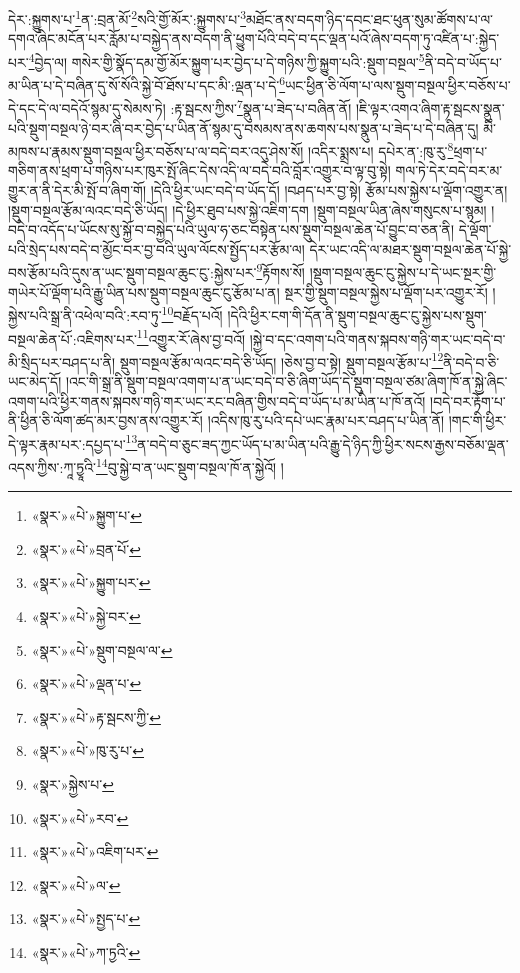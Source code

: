དེར་:སྐྱུགས་པ་\footnote{«སྣར་»«པེ་»སྐྱུག་པ་}ན་:བྲན་མོ་\footnote{«སྣར་»«པེ་»བྲན་པོ་}སའི་གྱོ་མོར་:སྐྱུགས་པ་\footnote{«སྣར་»«པེ་»སྐྱུག་པར་}མཐོང་ནས་བདག་ཉིད་དབང་ཐང་ཕུན་སུམ་ཚོགས་པ་ལ་དགའ་ཞིང་མངོན་པར་རློམ་པ་བསྐྱེད་ནས་བདག་ནི་ཕྱུག་པོའི་བདེ་བ་དང་ལྡན་པའོ་ཞེས་བདག་ཏུ་འཛིན་པ་:སྐྱེད་པར་\footnote{«སྣར་»«པེ་»སྐྱེ་བར་}བྱེད་ལ། གསེར་གྱི་སྣོད་དམ་གྱོ་མོར་སྐྱུག་པར་བྱེད་པ་དེ་གཉིས་ཀྱི་སྐྱུག་པའི་:སྡུག་བསྔལ་\footnote{«སྣར་»«པེ་»སྡུག་བསྔལ་ལ་}ནི་བདེ་བ་ཡོད་པ་མ་ཡིན་པ་དེ་བཞིན་དུ་སོ་སོའི་སྐྱེ་བོ་ཐོས་པ་དང་མི་:ལྡན་པ་དེ་\footnote{«སྣར་»«པེ་»ལྡན་པ་}ཡང་ཕྱིན་ཅི་ལོག་པ་ལས་སྡུག་བསྔལ་ཕྱིར་བཅོས་པ་དེ་དང་དེ་ལ་བདེའོ་སྙམ་དུ་སེམས་ཏེ། :རྟ་སྦངས་ཀྱིས་\footnote{«སྣར་»«པེ་»རྟ་སྦངས་ཀྱི་}སྣུན་པ་ཟེད་པ་བཞིན་ནོ། །ཇི་ལྟར་འགའ་ཞིག་རྟ་སྦངས་སྣུན་པའི་སྡུག་བསྔལ་ཉེ་བར་ཞི་བར་བྱེད་པ་ཡིན་ནོ་སྙམ་དུ་བསམས་ནས་ཆགས་པས་སྣུན་པ་ཟེད་པ་དེ་བཞིན་དུ། མི་མཁས་པ་རྣམས་སྡུག་བསྔལ་ཕྱིར་བཅོས་པ་ལ་བདེ་བར་འདུ་ཤེས་སོ། །འདིར་སྨྲས་པ། དཔེར་ན་:ཁུ་རུ་\footnote{«སྣར་»«པེ་»ཁུ་རུ་པ་}ཕྲག་པ་གཅིག་ནས་ཕྲག་པ་གཉིས་པར་ཁུར་སྤོ་ཞིང་དེས་འདི་ལ་བདེ་བའི་བློར་འགྱུར་བ་ལྟ་བུ་སྟེ། གལ་ཏེ་དེར་བདེ་བར་མ་གྱུར་ན་ནི་དེར་མི་སྤོ་བ་ཞིག་གོ། །དེའི་ཕྱིར་ཡང་བདེ་བ་ཡོད་དོ། །བཤད་པར་བྱ་སྟེ། རྩོམ་པས་སྐྱེས་པ་ལྡོག་འགྱུར་ན། །སྡུག་བསྔལ་རྩོམ་ལའང་བདེ་ཅི་ཡོད། །དེ་ཕྱིར་ཐུབ་པས་སྐྱེ་འཇིག་དག །སྡུག་བསྔལ་ཡིན་ཞེས་གསུངས་པ་སྙམ། །བདེ་བ་འདོད་པ་ཡོངས་སུ་སྐྱོ་བ་བསྐྱེད་པའི་ཡུལ་ཧ་ཅང་བསྟེན་པས་སྡུག་བསྔལ་ཆེན་པོ་བྱུང་བ་ཅན་ནི། དེ་ལྡོག་པའི་སྲེད་པས་བདེ་བ་མྱོང་བར་བྱ་བའི་ཡུལ་ལོངས་སྤྱོད་པར་རྩོམ་ལ། དེར་ཡང་འདི་ལ་མཐར་སྡུག་བསྔལ་ཆེན་པོ་སྐྱེ་བས་རྩོམ་པའི་དུས་ན་ཡང་སྡུག་བསྔལ་ཆུང་ངུ་:སྐྱེས་པར་\footnote{«སྣར་»སྐྱེས་པ་}རྟོགས་སོ། །སྡུག་བསྔལ་ཆུང་ངུ་སྐྱེས་པ་དེ་ཡང་སྔར་གྱི་གཡེར་པོ་ལྡོག་པའི་རྒྱུ་ཡིན་པས་སྡུག་བསྔལ་ཆུང་ངུ་རྩོམ་པ་ན། སྔར་གྱི་སྡུག་བསྔལ་སྐྱེས་པ་ལྡོག་པར་འགྱུར་རོ། །སྐྱེས་པའི་སྒྲ་ནི་འཕེལ་བའི་:རབ་ཏུ་\footnote{«སྣར་»«པེ་»རབ་}བརྗོད་པའོ། །དེའི་ཕྱིར་ངག་གི་དོན་ནི་སྡུག་བསྔལ་ཆུང་ངུ་སྐྱེས་པས་སྡུག་བསྔལ་ཆེན་པོ་:འཇིགས་པར་\footnote{«སྣར་»«པེ་»འཇིག་པར་}འགྱུར་རོ་ཞེས་བྱ་བའོ། །སྐྱེ་བ་དང་འགག་པའི་གནས་སྐབས་གཉི་གར་ཡང་བདེ་བ་མི་སྲིད་པར་བཤད་པ་ནི། སྡུག་བསྔལ་རྩོམ་ལའང་བདེ་ཅི་ཡོད། །ཅེས་བྱ་བ་སྟེ། སྡུག་བསྔལ་རྩོམ་པ་\footnote{«སྣར་»«པེ་»ལ་}ནི་བདེ་བ་ཅི་ཡང་མེད་དོ། །འང་གི་སྒྲ་ནི་སྡུག་བསྔལ་འགག་པ་ན་ཡང་བདེ་བ་ཅི་ཞིག་ཡོད་དེ་སྡུག་བསྔལ་ཙམ་ཞིག་ཁོ་ན་སྐྱེ་ཞིང་འགག་པའི་ཕྱིར་གནས་སྐབས་གཉི་གར་ཡང་རང་བཞིན་གྱིས་བདེ་བ་ཡོད་པ་མ་ཡིན་པ་ཁོ་ནའོ། །བདེ་བར་རྟོག་པ་ནི་ཕྱིན་ཅི་ལོག་ཚད་མར་བྱས་ནས་འགྱུར་རོ། །འདིས་ཁུ་རུ་པའི་དཔེ་ཡང་རྣམ་པར་བཤད་པ་ཡིན་ནོ། །གང་གི་ཕྱིར་དེ་ལྟར་རྣམ་པར་:དཔྱད་པ་\footnote{«སྣར་»«པེ་»སྤྱད་པ་}ན་བདེ་བ་ཅུང་ཟད་ཀྱང་ཡོད་པ་མ་ཡིན་པའི་རྒྱུ་དེ་ཉིད་ཀྱི་ཕྱིར་སངས་རྒྱས་བཅོམ་ལྡན་འདས་ཀྱིས་:ཀཱ་ཏྱཱའི་\footnote{«སྣར་»«པེ་»ཀ་ཏྱའི་}བུ་སྐྱེ་བ་ན་ཡང་སྡུག་བསྔལ་ཁོ་ན་སྐྱེའོ། །
